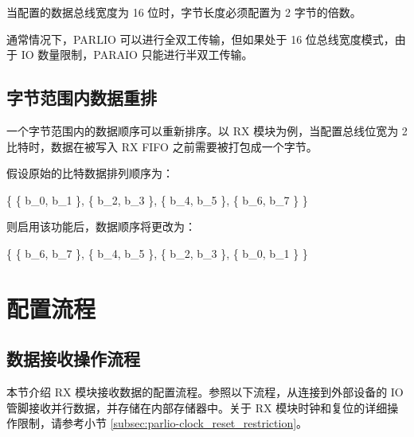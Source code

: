 \documentclass[main\_\_CN.tex]{subfiles}
\begin{document}
当配置的数据总线宽度为 16 位时，字节长度必须配置为 2 字节的倍数。

通常情况下，PARLIO 可以进行全双工传输，但如果处于 16 位总线宽度模式，由于 IO 数量限制，PARAIO 只能进行半双工传输。

\subsection{字节范围内数据重排}

一个字节范围内的数据顺序可以重新排序。以 RX 模块为例，当配置总线位宽为 2 比特时，数据在被写入 RX FIFO 之前需要被打包成一个字节。

假设原始的比特数据排列顺序为：

\begin{center}
\{ \{ b\_{0}, b\_{1} \}, \{ b\_{2}, b\_{3} \}, \{ b\_{4}, b\_{5} \}, \{ b\_{6}, b\_{7} \} \}
\end{center}

则启用该功能后，数据顺序将更改为：

\begin{center}
\{ \{ b\_{6}, b\_{7} \}, \{ b\_{4}, b\_{5} \}, \{ b\_{2}, b\_{3} \}, \{ b\_{0}, b\_{1} \} \}
\end{center}


\section{配置流程}
\label{sec:parlio-prog-procedures}

\subsection{数据接收操作流程}

本节介绍 RX 模块接收数据的配置流程。参照以下流程，从连接到外部设备的 IO 管脚接收并行数据，并存储在内部存储器中。关于 RX 模块时钟和复位的详细操作限制，请参考小节 \ref{subsec:parlio-clock_reset_restriction}。
\end{document}
